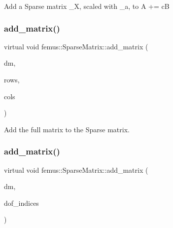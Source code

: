 Add a Sparse matrix {\ttfamily \+\_\+X}, scaled with {\ttfamily \+\_\+a}, to {\ttfamily A} += cB \mbox{\label{classfemus_1_1_sparse_matrix_a3a8dcbf32d59973ebd7fc6280f9ec10c}} 
\subsubsection{\texorpdfstring{add\+\_\+matrix()}{add\_matrix()}\hspace{0.1cm}{\footnotesize\ttfamily [1/2]}}
{\footnotesize\ttfamily virtual void femus\+::\+Sparse\+Matrix\+::add\+\_\+matrix (\begin{DoxyParamCaption}\item[{const \mbox{\hyperlink{classfemus_1_1_dense_matrix}{Dense\+Matrix}} \&}]{dm,  }\item[{const std\+::vector$<$ unsigned int $>$ \&}]{rows,  }\item[{const std\+::vector$<$ unsigned int $>$ \&}]{cols }\end{DoxyParamCaption})\hspace{0.3cm}{\ttfamily [pure virtual]}}

Add the full matrix to the Sparse matrix. \mbox{\label{classfemus_1_1_sparse_matrix_a7c54ac89800473bd8d85632228a0876e}} 
\subsubsection{\texorpdfstring{add\+\_\+matrix()}{add\_matrix()}\hspace{0.1cm}{\footnotesize\ttfamily [2/2]}}
{\footnotesize\ttfamily virtual void femus\+::\+Sparse\+Matrix\+::add\+\_\+matrix (\begin{DoxyParamCaption}\item[{const \mbox{\hyperlink{classfemus_1_1_dense_matrix}{Dense\+Matrix}} \&}]{dm,  }\item[{const std\+::vector$<$ unsigned int $>$ \&}]{dof\+\_\+indices }\end{DoxyParamCaption})\hspace{0.3cm}{\ttfamily [pure virtual]}}

